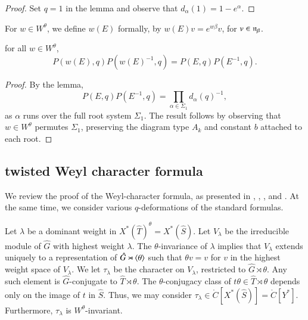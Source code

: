 \begin{proof}  Set $q=1$ in the lemma and observe that $d_\alpha(1)=1-e^\alpha$.
\end{proof}

For $w\in W^\theta$, we define $w(E)$ formally, by $w(E) v = e^{ w \beta} v$, for $v\in {\mathfrak n}_\beta$.

\begin{corollary}\label{cor:weyl-p}  
for all $w\in W^\theta$,
\[
P(w(E),q) P(w(E)^{-1},q) = P(E,q)P(E^{-1},q).
\]
\end{corollary}

\begin{proof} 
By the lemma,
\[
P(E,q)P(E^{-1},q) = \prod_{\alpha\in \Sigma_1} d_{\alpha}(q)^{-1},
\]
as $\alpha$ runs over the full root system $\Sigma_1$.
The result follows by observing  that $w\in W^\theta$ permutes $\Sigma_1$, preserving the  diagram type $A_k$
 and constant $b$ attached to each root.
\end{proof}



\subsection{twisted Weyl character formula}

We review the proof of the Weyl-character formula, as presented in \cite{kostant1961lie}, 
\cite{jantzen1977darstellungen}, \cite{wendt2001weyl}, and \cite{kumar2009characters}.
At the same time, we consider various $q$-deformations of the standard formulas.

Let $\lambda$ be a dominant weight in $X^*(\hat T)^\theta = X^*(\hat S)$.  Let $V_\lambda$ be the irreducible module
of $\hat G$ with highest weight $\lambda$.  The $\theta$-invariance of $\lambda$ implies that $V_\lambda$
extends uniquely to a representation of $\hat G \rtimes \langle{\theta}\rangle$ such that $\theta v = v$ for $v$ in the
highest weight space of $V_\lambda$.  We let $\tau_\lambda$ be the character on $V_\lambda$, restricted to $\hat G\rtimes\theta$.  Any such element is $\hat G$-conjugate to $\hat T\rtimes\theta$.
The $\theta$-conjugacy class of $t\theta\in \hat T\rtimes\theta$ 
depends only on the image of $t$ in $\hat S$.  
Thus, we may consider
$\tau_\lambda\in \ring{C}[X^*(\hat S)] =\ring{C}[Y^*]$.  Furthermore, $\tau_\lambda$ is $W^\theta$-invariant.

